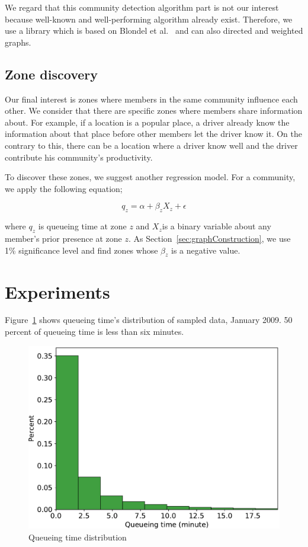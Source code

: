 \documentclass{article}
\begin{document}
We regard that this community detection algorithm part is not our interest because well-known and well-performing algorithm already exist. Therefore, we use a library which is based on  Blondel et al.~ and can also directed and weighted graphs.


\subsection{Zone discovery} \label{sec:zoneDiscovery}

Our final interest is zones where members in the same community influence each other. We consider that there are specific zones where members share information about. For example, if a location is a popular place, a driver already know the information about that place before other members let the driver know it. On the contrary to this, there can be a location where a driver know well and the driver contribute his community's productivity.

To discover these zones, we suggest another regression model. For a community, we apply the following equation;

\begin{equation} \label{eq:zoneRegression}
	q_{z}= \alpha + \beta_{z}X_{z} + \epsilon
\end{equation}

\noindent where $q_{z}$ is queueing time at zone $z$ and $X_{z}$is a binary variable about any member's prior presence at zone $z$. As Section~\ref{sec:graphConstruction}, we use 1\% significance level and find zones whose $\beta_{z}$ is a negative value.

\section{Experiments} \label{sec:experiments}



Figure~\ref{fig:queueTimeDist} shows queueing time's distribution of sampled data, January 2009. 50 percent of queueing time is less than six minutes.

\begin{figure} [h]
  \centering
  \includegraphics[width=.9\linewidth]{figs/queueTimeDist}
  \caption{Queueing time distribution}
  \label{fig:queueTimeDist}
\end{figure}
\end{document}
